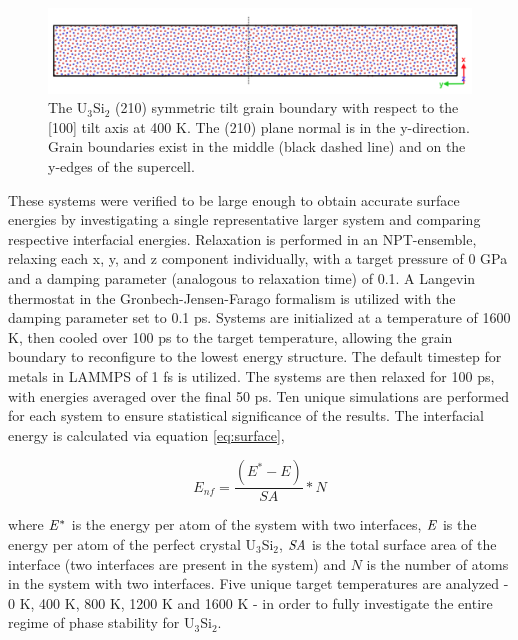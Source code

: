 \documentclass[review]{elsarticle}
\begin{document}
\begin{figure}[h]
 \centering
 \includegraphics[width=1.0\textwidth]{gbex.png} 
 \caption{The U$_{3}$Si$_{2}$ (210) symmetric tilt grain boundary with respect to the [100] tilt axis at 400 K. The (210) plane normal is in the y-direction. Grain boundaries exist in the middle (black dashed line) and on the y-edges of the supercell. }
 \label{fig:gbex}
\end{figure}

These systems were verified to be large enough to obtain accurate surface energies by investigating a single representative larger system and comparing respective interfacial energies. Relaxation is performed in an NPT-ensemble, relaxing each x, y, and z component individually, with a target pressure of 0 GPa and a damping parameter (analogous to relaxation time) of 0.1. A Langevin thermostat in the Gronbech-Jensen-Farago \cite{gjf2014} formalism is utilized with the damping parameter set to 0.1 ps. Systems are initialized at a temperature of 1600 K, then cooled over 100 ps to the target temperature, allowing the grain boundary to reconfigure to the lowest energy structure. The default timestep for metals in LAMMPS of 1 fs is utilized. The systems are then relaxed for 100 ps, with energies averaged over the final 50 ps. Ten unique simulations are performed for each system to ensure statistical significance of the results. The interfacial energy is calculated via equation \ref{eq:surface},

\begin{equation}
\label{eq:surface}
E_{nf}= \frac{(E^{*} - E)}{SA} * N
\end{equation}

where $\it{E^{*}}$ is the energy per atom of the system with two interfaces, $\it{E}$ is the energy per atom of the perfect crystal U$_{3}$Si$_{2}$, $\it{SA}$ is the total surface area of the interface (two interfaces are present in the system) and $\textit{N}$ is the number of atoms in the system with two interfaces. Five unique target temperatures are analyzed - 0 K, 400 K, 800 K, 1200 K and 1600 K - in order to fully investigate the entire regime of phase stability for U$_{3}$Si$_{2}$. 
\end{document}
